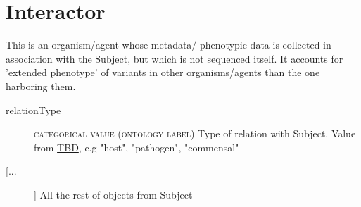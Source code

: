 \documentclass[a4paper, 10pt]{article}        %
\begin{document}
  
 \section*{{\color{teal} Interactor}}
This is an organism/agent whose metadata/ phenotypic data is collected in association with the Subject, but which is not sequenced itself. It accounts for 'extended phenotype' of variants in other organisms/agents than the one harboring them.
\begin{description}
	\item[relationType] {\textsc{categorical value (ontology label)}} Type of relation with Subject. Value from \href{}{TBD}, e.g "host", "pathogen", "commensal"
	\item[[...]] All the rest of objects from Subject
\end{description}
 
 
\end{document}

